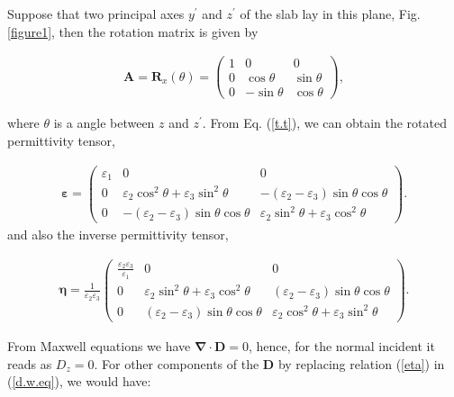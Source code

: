 \documentclass[9pt,twocolumn,twoside]{osajnl}
\begin{document}
Suppose that two principal axes  $y^{\prime}$ and $z^{\prime}$ of the slab lay in this plane, Fig. \ref{figure1}, then the rotation matrix is given by
 
\begin{align}\label{r.m}
        \mathbf{A}=\mathbf{R}_{x}(\theta)=
        \begin{pmatrix}
            1&0&0 \\
            0&\cos{\theta} &\sin{\theta} \\
            0&-\sin{\theta} & \cos{\theta}
        \end{pmatrix},
\end{align}

where $\theta$ is a angle between $z$ and $z^{\prime}$.  From Eq. (\ref{t.t}),  we can obtain the rotated permittivity tensor,

\begin{align}\label{eps}
        \boldsymbol{\varepsilon}=
        \begin{pmatrix}
             \varepsilon_{1} &0 &0 \\
            0&\varepsilon_{2} \cos^{2}{\theta} + \varepsilon_{3}\sin^{2}{\theta}   &-(\varepsilon_{2}-\varepsilon_{3})\sin{\theta}\cos{\theta} \\
            0&-(\varepsilon_{2}-\varepsilon_{3})\sin{\theta}\cos{\theta} &\varepsilon_{2} \sin^{2}{\theta} + \varepsilon_{3}\cos^{2}{\theta}
        \end{pmatrix}.
\end{align}
and also the inverse permittivity tensor,

\begin{align}\label{eta}
        \boldsymbol{\eta}= \frac{1}{\varepsilon_{2} \varepsilon_{3}}
        \begin{pmatrix}
            \frac{\varepsilon_{2} \varepsilon_{3}}{\varepsilon_{1}}& 0  &0 \\
            0&\varepsilon_{2} \sin^{2}{\theta} + \varepsilon_{3}\cos^{2}{\theta}   & (\varepsilon_{2}-\varepsilon_{3})\sin{ \theta} \cos {\theta} \\
            0& (\varepsilon_{2}-\varepsilon_{3})\sin{\theta}\cos{\theta} &\varepsilon_{2} \cos^{2}{\theta} + \varepsilon_{3}\sin^{2}{\theta}
        \end{pmatrix}.
\end{align}

From Maxwell equations we have $\boldsymbol{\nabla}\cdot \mathbf{D}=0$, hence, for  the normal incident it reads as ${D}_{z}=0$.  
For other components of the $\mathbf{D}$ by replacing relation (\ref{eta}) in (\ref{d.w.eq}), we would have:
\end{document}
